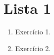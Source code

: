 \chapter*{Lista 1}
\chaptermark{}

\begin{enumerate}[leftmargin=*]

\item 
Exercício 1.


\item 
Exercício 2.


\end{enumerate}



